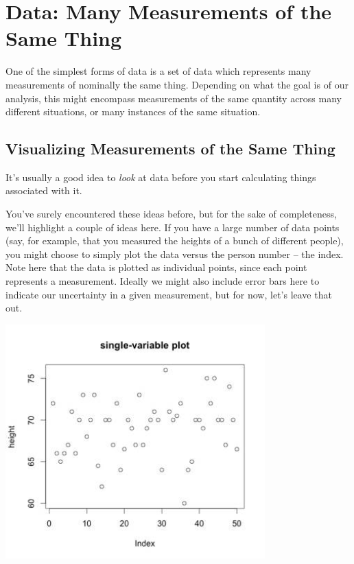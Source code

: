 


\section{Data: Many Measurements of the Same Thing}
{One of the simplest forms of data} is a set of data which represents many measurements of nominally the same thing.  Depending on what the goal is of our analysis, this might encompass measurements of the same quantity across many different situations, or many instances of the same situation.
\subsection{Visualizing Measurements of the Same Thing}

It's usually a good idea to \textit{look} at data before you start calculating things associated with it.

You've surely encountered these ideas before, but for the sake of completeness, we'll highlight a couple of ideas here.  If you have a large number of data points (say, for example, that you measured the heights of a bunch of different people), you might choose to simply plot the data versus the person number -- the index.  Note here that the data is plotted as individual points, since each point represents a measurement.  Ideally we might also include error bars here to indicate our uncertainty in a given measurement, but for now, let's leave that out.

\begin{center}
\includegraphics[width=0.75\textwidth]{FacesNight3/figs/singlevariableplot.jpg}
\label{fig:single-var-plot}
\end{center}

